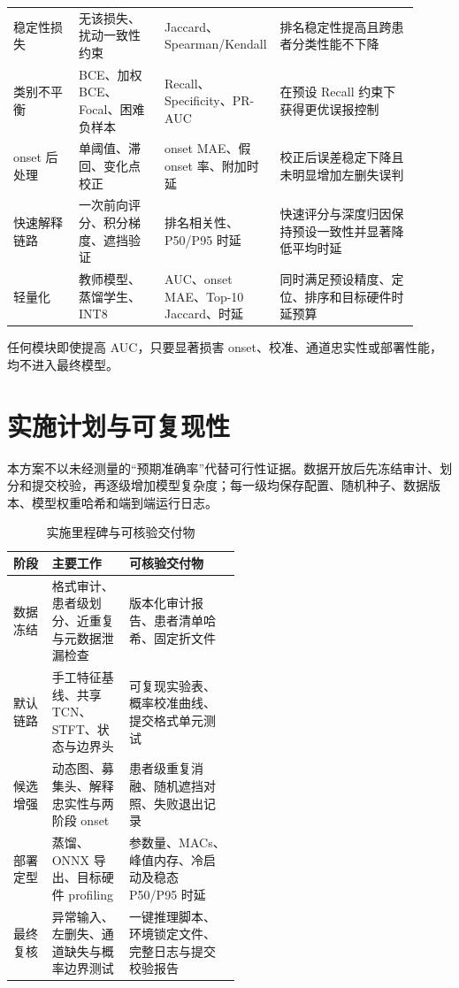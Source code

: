 \begin{longtable}{@{}p{0.16\linewidth}p{0.21\linewidth}p{0.20\linewidth}p{0.34\linewidth}@{}}
    稳定性损失 & 无该损失、扰动一致性约束 & Jaccard、Spearman/Kendall & 排名稳定性提高且跨患者分类性能不下降 \\
    类别不平衡 & BCE、加权 BCE、Focal、困难负样本 & Recall、Specificity、PR-AUC & 在预设 Recall 约束下获得更优误报控制 \\
    onset 后处理 & 单阈值、滞回、变化点校正 & onset MAE、假 onset 率、附加时延 & 校正后误差稳定下降且未明显增加左删失误判 \\
    快速解释链路 & 一次前向评分、积分梯度、遮挡验证 & 排名相关性、P50/P95 时延 & 快速评分与深度归因保持预设一致性并显著降低平均时延 \\
    轻量化 & 教师模型、蒸馏学生、INT8 & AUC、onset MAE、Top-10 Jaccard、时延 & 同时满足预设精度、定位、排序和目标硬件时延预算 \\
\end{longtable}
\endgroup

任何模块即使提高 AUC，只要显著损害 onset、校准、通道忠实性或部署性能，均不进入最终模型。

\clearpage
\section{实施计划与可复现性}

本方案不以未经测量的“预期准确率”代替可行性证据。数据开放后先冻结审计、划分和提交校验，再逐级增加模型复杂度；每一级均保存配置、随机种子、数据版本、模型权重哈希和端到端运行日志。

\begin{table}[htbp]
    \centering
    \small
    \caption{实施里程碑与可核验交付物}
    \label{tab:milestones}
    \renewcommand{\arraystretch}{1.25}
    \setlength{\tabcolsep}{4pt}
    \begin{tabularx}{\linewidth}{@{}p{0.17\linewidth}p{0.34\linewidth}X@{}}
        \toprule
        \textbf{阶段} & \textbf{主要工作} & \textbf{可核验交付物} \\
        \midrule
        数据冻结 & 格式审计、患者级划分、近重复与元数据泄漏检查 & 版本化审计报告、患者清单哈希、固定折文件 \\
        默认链路 & 手工特征基线、共享 TCN、STFT、状态与边界头 & 可复现实验表、概率校准曲线、提交格式单元测试 \\
        候选增强 & 动态图、募集头、解释忠实性与两阶段 onset & 患者级重复消融、随机遮挡对照、失败退出记录 \\
        部署定型 & 蒸馏、ONNX 导出、目标硬件 profiling & 参数量、MACs、峰值内存、冷启动及稳态 P50/P95 时延 \\
        最终复核 & 异常输入、左删失、通道缺失与概率边界测试 & 一键推理脚本、环境锁定文件、完整日志与提交校验报告 \\
        \bottomrule
    \end{tabularx}
\end{table}

